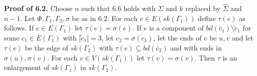 \textbf{Proof of 6.2.} Choose $n$ such that 6.6 holds with $\Sigma$ and $k$ replaced by $\hat{\Sigma}$ and $n - 1$. Let $\Phi, \Gamma_1, \Gamma_2, \sigma$ be as in 6.2. For each $e\in E(sk(\Gamma_1))$ define $\tau(e)$ as follows. If $e\in E(\Gamma_1)$ let $\tau(e) = \sigma(e)$. If $e$ is a component of $bd(\bar{c}_1)\setminus \tilde{c}_1$ for some $c_1\in E(\Gamma_1)$ with $|\tilde{c}_1| = 3$, let $c_2 = \sigma(c_1)$, let the ends of $e$ be $u, v$ and let $\tau(e)$ be the edge of $sk(\Gamma_2)$ with $\tau(e)\subseteq bd(\bar{c}_2)$ and with ends in $\sigma(u), \sigma(v)$. For each $v\in V(sk(\Gamma_1))$ let $\tau(v) = \sigma(v)$. Then $\tau$ is an enlargement of $sk(\Gamma_1)$ in $sk(\Gamma_2)$.
